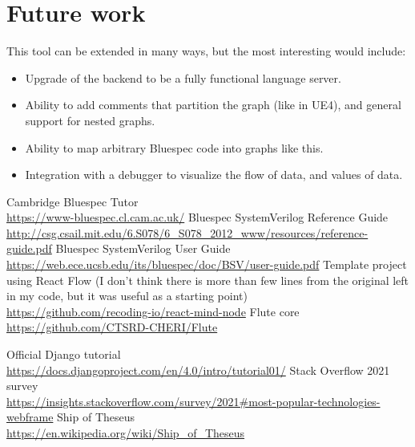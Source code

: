 \documentclass[12pt]{report}
\begin{document}
\section{Future work} 
This tool can be extended in many ways, but the most interesting would include: 
\begin{itemize} 
   \item Upgrade of the backend to be a fully functional language server. 
   \item Ability to add comments that partition the graph (like in UE4), and general support for nested graphs.
   \item Ability to map arbitrary Bluespec code into graphs like this. 
   \item Integration with a debugger to visualize the flow of data, and values of data. 
\end{itemize} 
\begin{thebibliography}{9}
   Cambridge Bluespec Tutor \\
   \href{https://www-bluespec.cl.cam.ac.uk/}{https://www-bluespec.cl.cam.ac.uk/}
   Bluespec SystemVerilog Reference Guide \\
   \href{http://csg.csail.mit.edu/6.S078/6\_S078\_2012\_www/resources/reference-guide.pdf}{http://csg.csail.mit.edu/6.S078/6\_S078\_2012\_www/resources/reference-guide.pdf}
   Bluespec SystemVerilog User Guide \\
   \href{https://web.ece.ucsb.edu/its/bluespec/doc/BSV/user-guide.pdf}{https://web.ece.ucsb.edu/its/bluespec/doc/BSV/user-guide.pdf}
   Template project using React Flow (I don't think there is more than few lines from the original left in my code, but it was useful as a starting point) \\
   \href{https://github.com/recoding-io/react-mind-node}{https://github.com/recoding-io/react-mind-node}
   Flute core
   \href{https://github.com/CTSRD-CHERI/Flute}{https://github.com/CTSRD-CHERI/Flute}
   
   Official Django tutorial  \\
   \href{https://docs.djangoproject.com/en/4.0/intro/tutorial01/}{https://docs.djangoproject.com/en/4.0/intro/tutorial01/}
   Stack Overflow 2021 survey \\
   \href{https://insights.stackoverflow.com/survey/2021#most-popular-technologies-webframe}{https://insights.stackoverflow.com/survey/2021\#most-popular-technologies-webframe}
   Ship of Theseus \\
   \href{https://en.wikipedia.org/wiki/Ship_of_Theseus}{https://en.wikipedia.org/wiki/Ship\_of\_Theseus}
\end{thebibliography}

\end{document}

